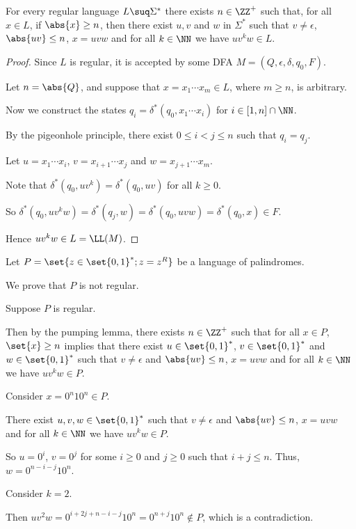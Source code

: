 \documentclass[11pt]{scrartcl}
\begin{document}
\begin{lemma}
  For every regular language $L\suq \Sigma^{*}$ there exists
  $n\in\ZZ^+$ such that, for all $x\in L$, if $\abs{x}\geq n$, then
  there exist $u, v$ and $w$ in $\Sigma^{*}$ such that
  $v\neq \epsilon$, $\abs{uv}\leq n$, $x = uvw$ and for all $k\in \NN$
  we have $uv^kw\in L$.
\end{lemma}
\begin{proof}
  \hfill

  Since $L$ is regular, it is accepted by some DFA
  $M = (Q, \epsilon, \delta, q_0, F)$.

  Let $n = \abs{Q}$, and suppose that $x = x_1\cdots x_m\in L$, where
  $m \geq n$, is arbitrary.

  Now we construct the states $q_i = \delta^{*}(q_0, x_1\cdots x_i)$
  for $i\in [1, n]\cap \NN$.

  By the pigeonhole principle, there exist $0 \leq i < j \leq n$ such
  that $q_i = q_j$.

  Let $u= x_1\cdots x_i$, $v = x_{i+1} \cdots x_j$ and
  $w = x_{j+1}\cdots x_m$.

  Note that $\delta^{*}(q_0, uv^k) = \delta^{*}(q_0, uv)$ for all
  $k \geq 0$.

  So
  $\delta^{*}(q_0, uv^kw) = \delta^{*}(q_j, w) = \delta^{*}(q_0, uvw)
  = \delta^{*}(q_0, x)\in F$.

  Hence $uv^kw \in L = \LL(M)$.
\end{proof}

\begin{example}

  Let $P = \set{z\in \set{0,1}^{*}; z = z^R}$ be a language of palindromes.

  We prove that $P$ is not regular.

  Suppose $P$ is regular. 

  Then by the pumping lemma, there exists $n\in \ZZ^+$ such that for
  all $x\in P$, $\set{x} \geq n$ implies that there exist
  $u\in \set{0, 1}^{*}$, $v \in \set{0, 1}^{*}$ and
  $w\in \set{0, 1}^{*}$ such that $v\neq \epsilon$ and
  $\abs{uv}\leq n$, $x = uvw$ and for all $k\in \NN$ we have
  $uv^kw\in P$.

  Consider $x = 0^n 1 0^n\in P$.

  There exist $u, v, w \in \set{0, 1}^{*}$ such that $v\neq \epsilon$
  and $\abs{uv}\leq n$, $x = uvw$ and for all $k\in \NN$ we have
  $uv^kw\in P$.

  So $u = 0^i$, $v = 0^j$ for some $i\geq 0$ and $j\geq 0$ such that
  $i+j \leq n$. Thus, $w = 0^{n-i-j}10^n$.

  Consider $k=2$.

  Then $uv^2w = 0^{i+2j+n-i-j}1 0^{n} = 0^{n+j}10^n\not\in P$, which is a contradiction.
\end{example}
\end{document}
